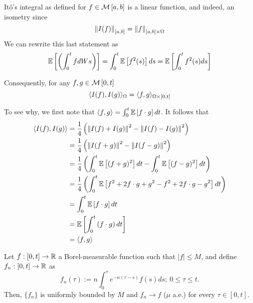 \documentclass[../TGMAFFIRO.tex]{subfiles}
\begin{document}
\begin{remark}
	It\^o's integral as defined for $f\in\mathcal{M}\left[a, b\right]$ is a linear function, and indeed, an isometry since
	\begin{equation}
		\left\lVert I(f)\right\rVert_{[a,b]} = \left\lVert f\right\rVert_{[a, b]\times\Omega}
	\end{equation}
	We can rewrite this last statement as
	\begin{equation}
		\mathbb{E}\left[\left(\int_0^t f dWs\right)\right] = \int_0^t\mathbb{E}\left[f^2(s)\right] ds = \mathbb{E}\left[\int_0^t f^2(s) ds\right]
	\end{equation}	 
	
	Consequently, for any $f, g \in \mathcal{M}\left[0, t\right]$
	\begin{equation}
		\langle I(f), I(g)\rangle_{\Omega} = \langle f, g\rangle_{\Omega\times[0, t]}
	\end{equation}

To see why, we first note that $\langle f, g\rangle = \int_0^t\mathbb{E}\left[f\cdot g\right]dt$. It follows that
\begin{align*}
	\langle I(f), I(g)\rangle &= \frac{1}{4}\left(\left\lVert I(f) + I(g)\right\rVert^2 - \left\lVert I(f) - I(g)\right\rVert^2\right)\\
						   &= \frac{1}{4}\left(\left\lVert I(f + g)\right\rVert^2 - \left\lVert I(f - g)\right\rVert^2\right)\\
						   &= \frac{1}{4}\left(\int_0^t \mathbb{E}\left[(f+g)^2\right]dt - \int_0^t \mathbb{E}\left[(f-g)^2\right]dt\right)\\
						   &= \frac{1}{4}\left(\int_0^t\mathbb{E}\left[f^2 + 2f\cdot g + g^2 - f^2 + 2f\cdot g - g^2\right] dt\right)\\
						   &= \int_0^t\mathbb{E}\left[f\cdot g\right] dt \\
						   &= \mathbb{E}\left[\int_0^t \left(f\cdot g\right) dt\right]\\
						   &= \langle f, g\rangle
\end{align*}
\end{remark}

\begin{proposition}\label{prop:bounded_simple_borel}
	Let $f:[0, t]\to \mathbb{R}$ a Borel-measurable function such that $|f|\leq M$, and define $f_n:[0, t]\to \mathbb{R}$ as
	\begin{equation}
		f_n(\tau) := n\int_0^\tau e^{-n(\tau-s)}f(s) ds; \ 0 \leq \tau \leq t.
	\end{equation}
Then, $\{f_n\}$ is uniformly bounded by $M$ and $f_n \to f$ ($\mu$ a.e.) for every $\tau\in [0, t]$.
\end{proposition}
\end{document}
